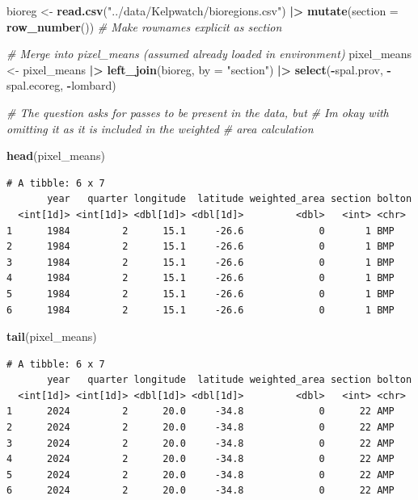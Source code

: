 \documentclass[
  british,
  10pt,
]{article}
\newenvironment{Shaded}{\begin{snugshade}}{\end{snugshade}}
\newcommand{\AttributeTok}[1]{\textcolor[rgb]{0.13,0.29,0.53}{#1}}
\newcommand{\CommentTok}[1]{\textcolor[rgb]{0.56,0.35,0.01}{\textit{#1}}}
\newcommand{\FunctionTok}[1]{\textcolor[rgb]{0.13,0.29,0.53}{\textbf{#1}}}
\newcommand{\NormalTok}[1]{#1}
\newcommand{\OtherTok}[1]{\textcolor[rgb]{0.56,0.35,0.01}{#1}}
\newcommand{\SpecialCharTok}[1]{\textcolor[rgb]{0.81,0.36,0.00}{\textbf{#1}}}
\newcommand{\StringTok}[1]{\textcolor[rgb]{0.31,0.60,0.02}{#1}}
\begin{document}
\begin{Shaded}
\begin{Highlighting}[]
\NormalTok{bioreg }\OtherTok{\textless{}{-}} \FunctionTok{read.csv}\NormalTok{(}\StringTok{"../data/Kelpwatch/bioregions.csv"}\NormalTok{) }\SpecialCharTok{|\textgreater{}} 
  \FunctionTok{mutate}\NormalTok{(}\AttributeTok{section =} \FunctionTok{row\_number}\NormalTok{())  }\CommentTok{\# Make rownames explicit as \textquotesingle{}section\textquotesingle{}}

\CommentTok{\# Merge into pixel\_means (assumed already loaded in environment)}
\NormalTok{pixel\_means }\OtherTok{\textless{}{-}}\NormalTok{ pixel\_means }\SpecialCharTok{|\textgreater{}}
  \FunctionTok{left\_join}\NormalTok{(bioreg, }\AttributeTok{by =} \StringTok{"section"}\NormalTok{) }\SpecialCharTok{|\textgreater{}} 
  \FunctionTok{select}\NormalTok{(}\SpecialCharTok{{-}}\NormalTok{spal.prov, }\SpecialCharTok{{-}}\NormalTok{spal.ecoreg, }\SpecialCharTok{{-}}\NormalTok{lombard)}

\CommentTok{\# The question asks for passes to be present in the data, but }
\CommentTok{\# I\textquotesingle{}m okay with omitting it as it is included in the weighted}
\CommentTok{\# area calculation}

\FunctionTok{head}\NormalTok{(pixel\_means)}
\end{Highlighting}
\end{Shaded}

\begin{verbatim}
# A tibble: 6 x 7
       year   quarter longitude  latitude weighted_area section bolton
  <int[1d]> <int[1d]> <dbl[1d]> <dbl[1d]>         <dbl>   <int> <chr> 
1      1984         2      15.1     -26.6             0       1 BMP   
2      1984         2      15.1     -26.6             0       1 BMP   
3      1984         2      15.1     -26.6             0       1 BMP   
4      1984         2      15.1     -26.6             0       1 BMP   
5      1984         2      15.1     -26.6             0       1 BMP   
6      1984         2      15.1     -26.6             0       1 BMP   
\end{verbatim}

\begin{Shaded}
\begin{Highlighting}[]
\FunctionTok{tail}\NormalTok{(pixel\_means)}
\end{Highlighting}
\end{Shaded}

\begin{verbatim}
# A tibble: 6 x 7
       year   quarter longitude  latitude weighted_area section bolton
  <int[1d]> <int[1d]> <dbl[1d]> <dbl[1d]>         <dbl>   <int> <chr> 
1      2024         2      20.0     -34.8             0      22 AMP   
2      2024         2      20.0     -34.8             0      22 AMP   
3      2024         2      20.0     -34.8             0      22 AMP   
4      2024         2      20.0     -34.8             0      22 AMP   
5      2024         2      20.0     -34.8             0      22 AMP   
6      2024         2      20.0     -34.8             0      22 AMP   
\end{verbatim}
\end{document}
